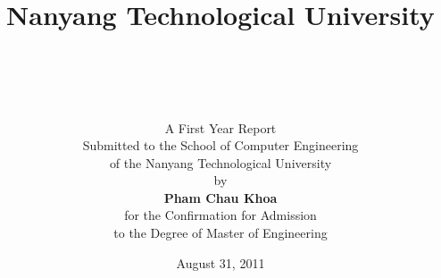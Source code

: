 
\title{\sc
\vspace{-0.5in} Nanyang Technological University \\
\vspace*{0.3in} \centering
{}\\[1em]
\vspace{0.2in}{\huge\bf \reporttitle }\\[1em]}

\author{
A First Year Report\\
Submitted to the School of Computer Engineering\\
of the Nanyang Technological University\\[1em]
by\\[1em]
{\rm\bf Pham Chau Khoa}\\[1.5em]
for the Confirmation for Admission \\
to the Degree of Master of Engineering\\[1.5em]
}

\date{August 31, 2011}
\maketitle
\thispagestyle{empty}        %

%
%
